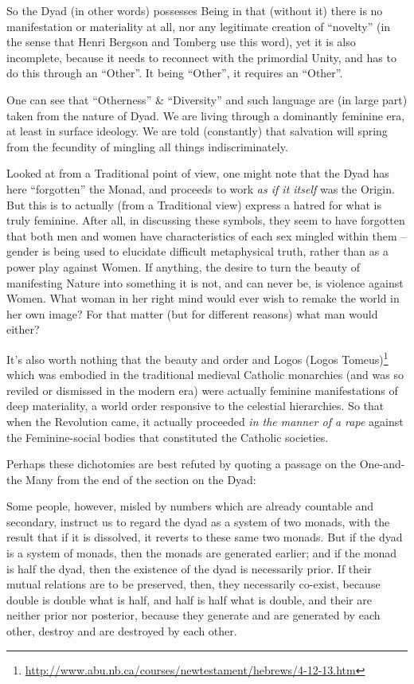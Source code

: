 So the Dyad (in other words) possesses Being in that (without it) there is no manifestation or materiality at all, nor any legitimate creation of ``novelty'' (in the sense that Henri Bergson and Tomberg use this word), yet it is also incomplete, because it needs to reconnect with the primordial Unity, and has to do this through an ``Other''. It being ``Other'', it requires an ``Other''.

One can see that ``Otherness'' \& ``Diversity'' and such language are (in large part) taken from the nature of Dyad. We are living through a dominantly feminine era, at least in surface ideology. We are told (constantly) that salvation will spring from the fecundity of mingling all things indiscriminately.

Looked at from a Traditional point of view, one might note that the Dyad has here ``forgotten'' the Monad, and proceeds to work \emph{as if it itself} was the Origin. But this is to actually (from a Traditional view) express a hatred for what is truly feminine. After all, in discussing these symbols, they seem to have forgotten that both men and women have characteristics of each sex mingled within them -- gender is being used to elucidate difficult metaphysical truth, rather than as a power play against Women. If anything, the desire to turn the beauty of manifesting Nature into something it is not, and can never be, is violence against Women. What woman in her right mind would ever wish to remake the world in her own image? For that matter (but for different reasons) what man would either?

It's also worth nothing that the beauty and order and Logos (Logos Tomeus)\footnote{\url{http://www.abu.nb.ca/courses/newtestament/hebrews/4-12-13.htm}} which was embodied in the traditional medieval Catholic monarchies (and was so reviled or dismissed in the modern era) were actually feminine manifestations of deep materiality, a world order responsive to the celestial hierarchies. So that when the Revolution came, it actually proceeded \emph{in the manner of a rape} against the Feminine-social bodies that constituted the Catholic societies.

Perhaps these dichotomies are best refuted by quoting a passage on the One-and-the Many from the end of the section on the Dyad:

\begin{quotex}
Some people, however, misled by numbers which are already countable and secondary, instruct us to regard the dyad as a system of two monads, with the result that if it is dissolved, it reverts to these same two monads. But if the dyad is a system of monads, then the monads are generated earlier; and if the monad is half the dyad, then the existence of the dyad is necessarily prior. If their mutual relations are to be preserved, then, they necessarily co-exist, because double is double what is half, and half is half what is double, and their are neither prior nor posterior, because they generate and are generated by each other, destroy and are destroyed by each other.
\end{quotex}



